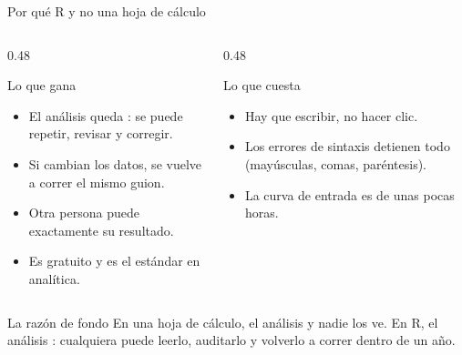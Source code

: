 \documentclass[aspectratio=169,10pt]{beamer}
\begin{document}
\begin{frame}{Por qué R y no una hoja de cálculo}
  \scriptsize
  \begin{columns}[T,onlytextwidth]
    \begin{column}{0.48\textwidth}
      \begin{block}{Lo que gana}
        \tiny
        \begin{itemize}\setlength{\itemsep}{-0.05cm}
          \item El análisis queda : se puede repetir, revisar y
                corregir.
          \item Si cambian los datos, se vuelve a correr el mismo guion.
          \item Otra persona puede  exactamente su
                resultado.
          \item Es gratuito y es el estándar en analítica.
        \end{itemize}
      \end{block}
    \end{column}
    \begin{column}{0.48\textwidth}
      \begin{alertblock}{Lo que cuesta}
        \tiny
        \begin{itemize}\setlength{\itemsep}{-0.05cm}
          \item Hay que escribir, no hacer clic.
          \item Los errores de sintaxis detienen todo (mayúsculas, comas,
                paréntesis).
          \item La curva de entrada es de unas pocas horas.
        \end{itemize}
      \end{alertblock}
    \end{column}
  \end{columns}

  \vspace{0.1cm}
  \begin{exampleblock}{La razón de fondo}
    \tiny
    En una hoja de cálculo, el análisis  y nadie los ve. En R, el análisis : cualquiera
    puede leerlo, auditarlo y volverlo a correr dentro de un año.
  \end{exampleblock}
\end{frame}
\end{document}
